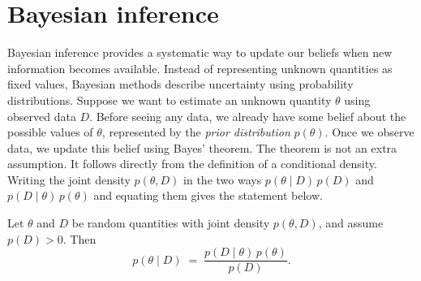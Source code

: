 \section{Bayesian inference}\label{sec: bayesian inference}


Bayesian inference provides a systematic way to update our beliefs when new information becomes available. Instead of representing unknown quantities as fixed values, Bayesian methods describe uncertainty using probability distributions. Suppose we want to estimate an unknown quantity $\theta$ using observed data $D$. Before seeing any data, we already have some belief about the possible values of $\theta$, represented by the \emph{prior distribution} $p(\theta)$. Once we observe data, we update this belief using Bayes' theorem. The theorem is not an extra assumption. It follows directly from the definition of a conditional density. Writing the joint density $p(\theta, D)$ in the two ways $p\left(\theta \mid D\right)\, p(D)$ and $p\left(D \mid \theta\right)\, p(\theta)$ and equating them gives the statement below.
\begin{theorem}\label{thm:bayes}
Let $\theta$ and $D$ be random quantities with joint density $p(\theta, D)$, and assume $p(D) > 0$. Then
    \begin{equation}
      p(\theta \mid D)
      \;=\; \frac{p(D \mid \theta)\, p(\theta)}{p(D)}. \label{eq:bayes}
    \end{equation}
\end{theorem}

